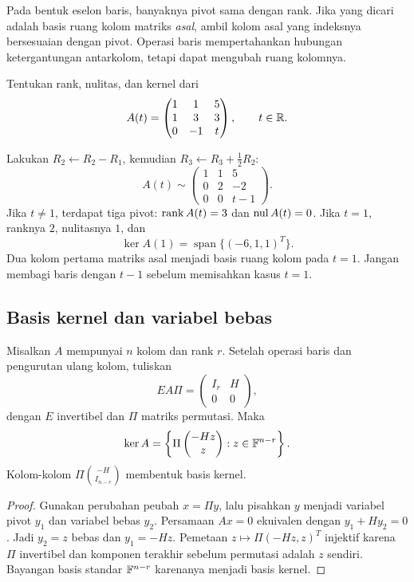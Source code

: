 Pada bentuk eselon baris, banyaknya pivot sama dengan rank. Jika yang
dicari adalah basis ruang kolom matriks \emph{asal}, ambil kolom asal
yang indeksnya bersesuaian dengan pivot. Operasi baris mempertahankan
hubungan ketergantungan antarkolom, tetapi dapat mengubah ruang kolomnya.

\begin{exam}
    Tentukan rank, nulitas, dan kernel dari
    \[
        A(t)=\begin{pmatrix}1&1&5\\1&3&3\\0&-1&t\end{pmatrix},\qquad t\in\mathbb{R}.
    \]
\end{exam}
\begin{solution}
    Lakukan $R_2\leftarrow R_2-R_1$, kemudian
    $R_3\leftarrow R_3+\tfrac12R_2$:
    \[
        A(t)\sim
        \begin{pmatrix}1&1&5\\0&2&-2\\0&0&t-1\end{pmatrix}.
    \]
    Jika $t\ne1$, terdapat tiga pivot: $\operatorname{rank} A(t)=3$ dan
    $\operatorname{nul} A(t)=0$. Jika $t=1$, ranknya $2$, nulitasnya $1$, dan
    \[
        \ker A(1)=\operatorname{span}\{(-6,1,1)^T\}.
    \]
    Dua kolom pertama matriks asal menjadi basis ruang kolom pada $t=1$.
    Jangan membagi baris dengan $t-1$ sebelum memisahkan kasus $t=1$.
\end{solution}

\subsection{Basis kernel dan variabel bebas}
\label{rank:basis-kernel}

\begin{prop}
    Misalkan $A$ mempunyai $n$ kolom dan rank $r$.
    Setelah operasi baris dan pengurutan ulang kolom, tuliskan
    \[
        EA\Pi=\begin{pmatrix}I_r&H\\0&0\end{pmatrix},
    \]
    dengan $E$ invertibel dan $\Pi$ matriks permutasi.
    Maka
    \[
        \ker A=\left\{\Pi\begin{pmatrix}-Hz\\z\end{pmatrix}:
            z\in\mathbb{F}^{n-r}\right\}.
    \]
    Kolom-kolom $\Pi\binom{-H}{I_{n-r}}$ membentuk basis kernel.
\end{prop}
\begin{proof}
    Gunakan perubahan peubah $x=\Pi y$, lalu pisahkan $y$ menjadi
    variabel pivot $y_1$ dan variabel bebas $y_2$.
    Persamaan $Ax=0$ ekuivalen dengan $y_1+Hy_2=0$.
    Jadi $y_2=z$ bebas dan $y_1=-Hz$.
    Pemetaan $z\mapsto\Pi(-Hz,z)^T$ injektif karena $\Pi$ invertibel
    dan komponen terakhir sebelum permutasi adalah $z$ sendiri.
    Bayangan basis standar $\mathbb{F}^{n-r}$ karenanya menjadi basis kernel.
\end{proof}

